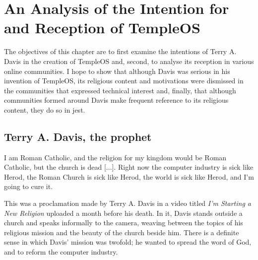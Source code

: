 \documentclass[Draft.tex]{subfiles}
\begin{document}
\chapter{An Analysis of the Intention for and Reception of TempleOS}

The objectives of this chapter are to first examine
the intentions of Terry A. Davis in the creation of TempleOS and, second,
to analyse its reception in various online communities.
I hope to show that although Davis was serious in his invention of TempleOS,
its religious content and motivations were dismissed
in the communities that expressed technical interest and, finally,
that although communities formed around Davis make frequent reference
to its religious content, they do so in jest.

\section*{Terry A. Davis, the prophet}

\begin{displayquote}
  I am Roman Catholic, and the religion for my kingdom
  would be Roman Catholic, but the church is dead [...].
  Right now the computer industry is sick like Herod,
  the Roman Church is sick like Herod,
  the world is sick like Herod, and I'm going to cure it.
\end{displayquote}

This was a proclamation made by Terry A. Davis \parencite*{NewReligionVid}
in a video titled \textit{I'm Starting a New Religion}
uploaded a month before his death.
In it, Davis stands outside a church and speaks informally to the camera,
weaving between the topics of his religious mission
and the beauty of the church beside him.
There is a definite sense in which Davis' mission was twofold;
he wanted to spread the word of God, and to reform the computer industry.
\end{document}
